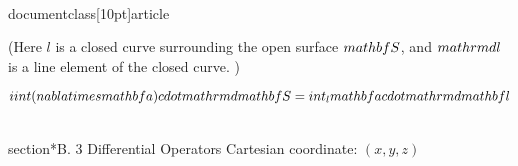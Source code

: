 \\documentclass[10pt]{article}
\begin{document}
{{{{{{(Here $l$ is a closed curve surrounding the open surface $\\mathbf{S}$, and $\\mathrm{dl}$ is a line element of the closed curve. )

$$
\\iint(\\nabla \\times \\mathbf{a}) \\cdot \\mathrm{d} \\mathbf{S}=\\int_{l} \\mathbf{a} \\cdot \\mathrm{d} \\mathbf{l}
$$

\\section*{B. 3 Differential Operators}
Cartesian coordinate: $(x, y, z)$

}}}}}}
\end{document}
